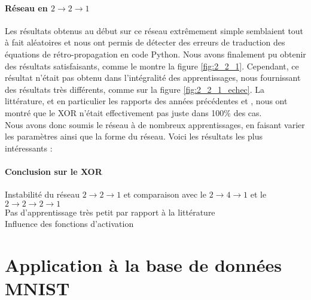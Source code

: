 \paragraph{Réseau en $2\rightarrow2\rightarrow1$} %

Les résultats obtenus au début sur ce réseau extrêmement simple semblaient tout à fait aléatoires et nous ont permis de détecter des erreurs de traduction des équations de rétro-propagation en code Python. Nous avons finalement pu obtenir des résultats satisfaisants, comme le montre la figure \ref{fig:2_2_1}. Cependant, ce résultat n'était pas obtenu dans l'intégralité des apprentissages, nous fournissant des résultats très différents, comme sur la figure \ref{fig:2_2_1_echec}. La littérature, et en particulier les rapports des années précédentes \cite{appartement} et \cite{Pinaple}, nous ont montré que le XOR n'était effectivement pas juste dans 100\% des cas.\\
Nous avons donc soumis le réseau à de nombreux apprentissages, en faisant varier les paramètres ainsi que la forme du réseau. Voici les résultats les plus intéressants :


\paragraph{Conclusion sur le XOR} %
\label{par:conclusion_sur_le_xor}
Instabilité du réseau $2\rightarrow2\rightarrow1$ et comparaison avec le $ 2 \rightarrow 4 \rightarrow 1 $ et le $2 \rightarrow 2 \rightarrow 2 \rightarrow 1 $ \\
Pas d'apprentissage très petit par rapport à la littérature\\
Influence des fonctions d'activation

\section{Application à la base de données MNIST}



